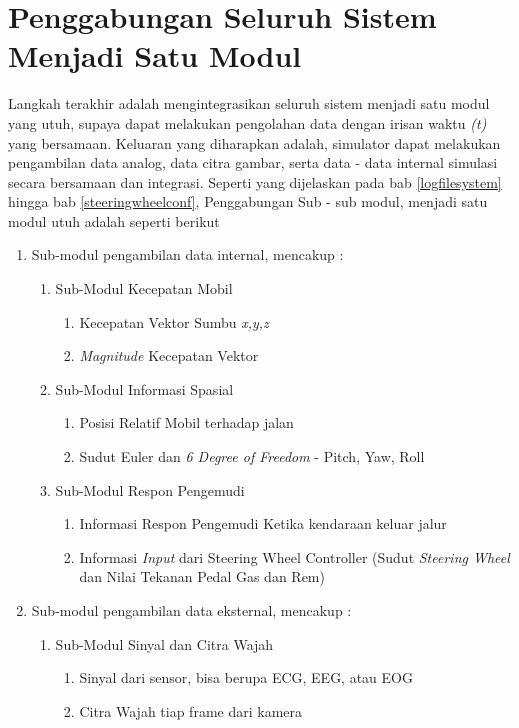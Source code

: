\section{Penggabungan Seluruh Sistem Menjadi Satu Modul}
\vspace{1ex}
    Langkah terakhir adalah mengintegrasikan seluruh sistem menjadi satu modul yang utuh, supaya dapat melakukan pengolahan data dengan irisan waktu \textit{(t)} yang bersamaan. Keluaran yang diharapkan adalah, simulator dapat melakukan pengambilan data analog, data citra gambar, serta data - data internal simulasi secara bersamaan dan integrasi. Seperti yang dijelaskan pada bab \ref{logfilesystem} hingga bab \ref{steeringwheelconf}, Penggabungan Sub - sub modul, menjadi satu modul utuh adalah seperti berikut
    
    \begin{enumerate}[nolistsep]
	
	\item Sub-modul pengambilan data internal, mencakup :
	    \begin{enumerate}[nolistsep]
	        \item Sub-Modul Kecepatan Mobil
	            \begin{enumerate}
	                \item Kecepatan Vektor Sumbu \textit{x,y,z}
	                \item \textit{Magnitude} Kecepatan Vektor
	            \end{enumerate}
	        \item Sub-Modul Informasi Spasial
	            \begin{enumerate}
	                \item Posisi Relatif Mobil terhadap jalan
	                \item Sudut Euler dan \textit{6 Degree of Freedom} - Pitch, Yaw, Roll
	            \end{enumerate}
	        \item Sub-Modul Respon Pengemudi
	            \begin{enumerate}
	                \item Informasi Respon Pengemudi Ketika kendaraan keluar jalur
	                \item Informasi \textit{Input} dari Steering Wheel Controller (Sudut \textit{Steering Wheel} dan Nilai Tekanan Pedal Gas dan Rem)
	            \end{enumerate}
	    \end{enumerate}
	\item Sub-modul pengambilan data eksternal, mencakup :
	    \begin{enumerate}[nolistsep]
	        \item Sub-Modul Sinyal dan Citra Wajah
	            \begin{enumerate}
	                \item Sinyal dari sensor, bisa berupa ECG, EEG, atau EOG
	                \item Citra Wajah tiap frame dari kamera
	            \end{enumerate}
	    \end{enumerate}
	
	\end{enumerate}
    
